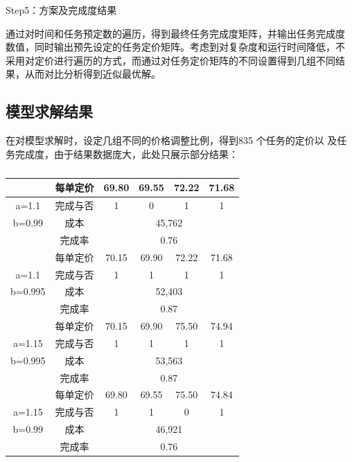 Step5：方案及完成度结果

通过对时间和任务预定数的遍历，得到最终任务完成度矩阵，并输出任务完成度
数值，同时输出预先设定的任务定价矩阵。考虑到对复杂度和运行时间降低，不
采用对定价进行遍历的方式，而通过对任务定价矩阵的不同设置得到几组不同结
果，从而对比分析得到近似最优解。
\subsection{模型求解结果}
在对模型求解时，设定几组不同的价格调整比例，得到835 个任务的定价以
及任务完成度，由于结果数据庞大，此处只展示部分结果：
\begin{longtable}[c]{cccccc}
    \caption{}
    \label{tab:my-table}\\
    \hline
            & 每单定价 & 69.80 & 69.55 & 72.22 & 71.68 \\
    \endfirsthead
    \endhead
    \hline
    \endfoot
    \endlastfoot
    a=1.1   & 完成与否 & 1     & 0     & 1     & 1     \\
    b=0.99  & 成本   & \multicolumn{4}{c}{45,762}    \\
            & 完成率  & \multicolumn{4}{c}{0.76}      \\
            & 每单定价 & 70.15 & 69.90 & 72.22 & 71.68 \\
    a=1.1   & 完成与否 & 1     & 1     & 1     & 1     \\
    b=0.995 & 成本   & \multicolumn{4}{c}{52,403}    \\
            & 完成率  & \multicolumn{4}{c}{0.87}      \\
            & 每单定价 & 70.15 & 69.90 & 75.50 & 74.94 \\
    a=1.15  & 完成与否 & 1     & 1     & 1     & 1     \\
    b=0.995 & 成本   & \multicolumn{4}{c}{53,563}    \\
            & 完成率  & \multicolumn{4}{c}{0.87}      \\
            & 每单定价 & 69.80 & 69.55 & 75.50 & 74.84 \\
    a=1.15  & 完成与否 & 1     & 1     & 0     & 1     \\
    b=0.99  & 成本   & \multicolumn{4}{c}{46,921}    \\
            & 完成率  & \multicolumn{4}{c}{0.76}      \\ \hline
    \end{longtable}